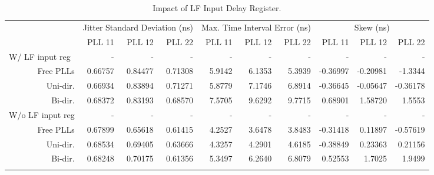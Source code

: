 \begin{table}[!ht]
    \begin{center}
        \begin{footnotesize}
            \setlength{\tabcolsep}{.9\tabcolsep}
            \begin{tabular}{ll|r|r|r|r|r|r|r|r|r|}           
                \cline{3-11}
                && \multicolumn{3}{c|}{Jitter Standard Deviation (ns)} & \multicolumn{3}{c|}{Max. Time Interval Error (ns)} & \multicolumn{3}{c|}{Skew (ns)} \T\\
                \cline{3-11} 
                &&PLL 11&PLL 12&PLL 22    &PLL 11&PLL 12&PLL 22    &PLL 11&PLL 12&PLL 22\T\\
                \hline
                \multicolumn{2}{|l|}{W/ \ac{LF} input reg}&-&-&-&-&-&-&-&-&-\T\\
                \multicolumn{2}{|r|}{Free PLLs} &0.66757 &0.84477 &0.71308    &5.9142 &6.1353 &5.3939   &-0.36997 &-0.20981 &-1.3344  \T\\
                \multicolumn{2}{|r|}{Uni-dir.}  &0.66934 &0.83894 &0.71271    &5.8779 &7.1746 &6.8914   &-0.36645 &-0.05647 &-0.36178 \T\\
                \multicolumn{2}{|r|}{Bi-dir.}   &0.68372 &0.83193 &0.68570    &7.5705 &9.6292 &9.7715   & 0.68901 & 1.58720 & 1.5553  \T\\
                \hline
                \multicolumn{2}{|l|}{W/o \ac{LF} input reg}&-&-&-&-&-&-&-&-&-\T\\
                \multicolumn{2}{|r|}{Free PLLs} &0.67899 &0.65618 &0.61415    &4.2527 &3.6478 &3.8483   &-0.31418 &0.11897 &-0.57619 \T\\
                \multicolumn{2}{|r|}{Uni-dir.}  &0.68534 &0.69405 &0.63666    &4.3257 &4.2901 &4.6185   &-0.38849 &0.23363 & 0.21156 \T\\
                \multicolumn{2}{|r|}{Bi-dir.}   &0.68248 &0.70175 &0.61356    &5.3497 &6.2640 &6.8079   & 0.52553 &1.7025  & 1.9499  \T\\
                \hline
                \B
            \end{tabular}
        \end{footnotesize}
        \caption{Impact of \ac{LF} Input Delay Register.}
        \label{table:lf_delay}
    \end{center}
    \vspace{-0.5cm}
\end{table}

